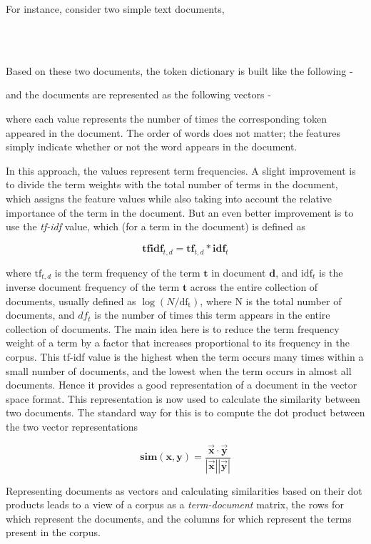 For instance, consider two simple text documents,

\begin{center}
    \\
    \\
\end{center}

Based on these two documents, the token dictionary is built like the following -


and the documents are represented as the following vectors -


where each value represents the number of times the corresponding token appeared in the document. The order of words does not matter; the features simply indicate whether or not the word appears in the document.

In this approach, the values represent term frequencies. A slight improvement is to divide the term weights with the total number of terms in the document, which assigns the feature values while also taking into account the relative importance of the term in the document. But an even better improvement is to use the \emph{tf-idf} value, which (for a term in the document) is defined as

$$\mathbf{tfidf}_{t, d} = \mathbf{tf}_{t, d} * \mathbf{idf}_{t}$$

where $\mathrm{tf}_{t, d}$ is the term frequency of the term $\mathbf{t}$ in document $\mathbf{d}$, and $\mathrm{idf}_{t}$ is the inverse document frequency of the term $\mathbf{t}$ across the entire collection of documents, usually defined as $\log(N / \mathrm{df_{t}})$, where $\mathrm{N}$ is the total number of documents, and $df_{t}$ is the number of times this term appears in the entire collection of documents. The main idea here is to reduce the term frequency weight of a term by a factor that increases proportional to its frequency in the corpus. This tf-idf value is the highest when the term occurs many times within a small number of documents, and the lowest when the term occurs in almost all documents. Hence it provides a good representation of a document in the vector space format. This representation is now used to calculate the similarity between two documents. The standard way for this is to compute the dot product between the two vector representations

$$\mathbf{sim(x, y)} = \frac{\vec{\mathbf{x}} \cdot \vec{\mathbf{y}}}{|\vec{\mathbf{x}}| | \vec{\mathbf{y}}|}$$

Representing documents as vectors and calculating similarities based on their dot products leads to a view of a corpus as a \emph{term-document} matrix, the rows for which represent the documents, and the columns for which represent the terms present in the corpus.
